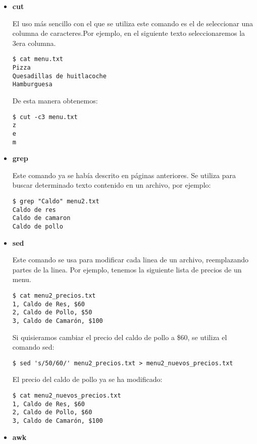 \documentclass[a4paper]{article}
\begin{document}
\begin{itemize}
\item \textbf{cut}

El uso más sencillo con el que se utiliza este comando es el de seleccionar una columna de caracteres.Por ejemplo, en el siguiente texto seleccionaremos la 3era columna.

\begin{verbatim}
$ cat menu.txt
Pizza
Quesadillas de huitlacoche
Hamburguesa
\end{verbatim}

De esta manera obtenemos:

\begin{verbatim}
$ cut -c3 menu.txt
z
e
m
\end{verbatim}


\item \textbf{grep}

Este comando ya se había descrito en páginas anteriores. Se utiliza para buscar determinado texto contenido en un archivo, por ejemplo:

\begin{verbatim}
$ grep "Caldo" menu2.txt
Caldo de res
Caldo de camaron
Caldo de pollo
\end{verbatim}

\item \textbf{sed}

Este comando se usa para modificar cada linea de un archivo, reemplazando partes de la linea. Por ejemplo, tenemos la siguiente lista de precios de un menu.

\begin{verbatim}
$ cat menu2_precios.txt
1, Caldo de Res, $60
2, Caldo de Pollo, $50
3, Caldo de Camarón, $100
\end{verbatim}

Si quisieramos cambiar el precio del caldo de pollo a \$60, se utiliza el comando sed:

\begin{verbatim}
$ sed 's/50/60/' menu2_precios.txt > menu2_nuevos_precios.txt
\end{verbatim}

El precio del caldo de pollo ya se ha modificado:

\begin{verbatim}
$ cat menu2_nuevos_precios.txt
1, Caldo de Res, $60
2, Caldo de Pollo, $60
3, Caldo de Camarón, $100
\end{verbatim}


\item \textbf{awk}


\end{itemize}
\end{document}
